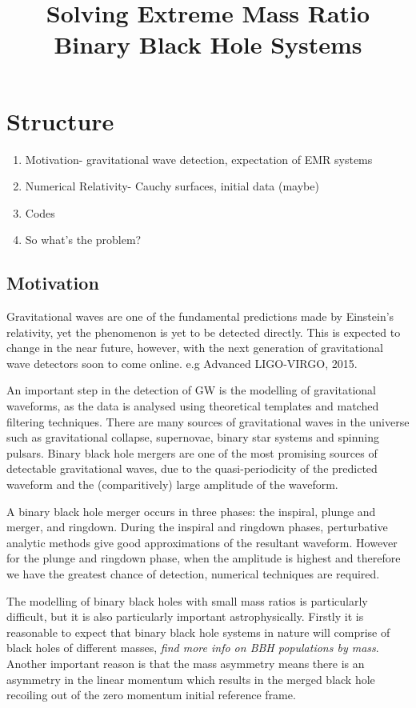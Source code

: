 \documentclass{article}
\begin{document}
\title{Solving Extreme Mass Ratio Binary Black Hole Systems}

\section{Structure}
\begin{enumerate}
\item Motivation- gravitational wave detection, expectation of EMR systems
\item Numerical Relativity- Cauchy surfaces, initial data (maybe)
\item Codes
\item So what's the problem?
\end{enumerate}

\subsection{Motivation}
Gravitational waves are one of the fundamental predictions made by Einstein's relativity, yet the phenomenon is yet to be detected directly. This is expected to change in the near future, however, with the next generation of gravitational wave detectors soon to come online. e.g Advanced LIGO-VIRGO, 2015.

An important step in the detection of GW is the modelling of gravitational waveforms, as the data is analysed using theoretical templates and matched filtering techniques. There are many sources of gravitational waves in the universe such as gravitational collapse, supernovae, binary star systems and spinning pulsars. Binary black hole mergers are one of the most promising sources of detectable gravitational waves, due to the quasi-periodicity of the predicted waveform and the (comparitively) large amplitude of the waveform.

A binary black hole merger occurs in three phases: the inspiral, plunge and merger, and ringdown. During the inspiral and ringdown phases, perturbative analytic methods give good approximations of the resultant waveform. However for the plunge and ringdown phase, when the amplitude is highest and therefore we have the greatest chance of detection, numerical techniques are required. 

The modelling of binary black holes with small mass ratios is particularly difficult, but it is also particularly important astrophysically. Firstly it is reasonable to expect that binary black hole systems in nature will comprise of black holes of different masses, \textit{find more info on BBH populations by mass}. Another important reason is that the mass asymmetry means there is an asymmetry in the linear momentum which results in the merged black hole recoiling out of the zero momentum initial reference frame.
\end{document}
